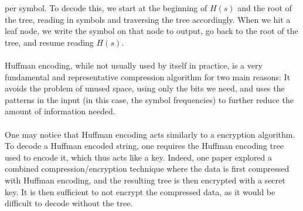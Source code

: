 \documentclass[11pt]{article}
\begin{document}
per symbol. To decode this, we start at the beginning of $H(s)$ and the root of the tree, reading in symbols 
and traversing the tree accordingly. When we hit a leaf node, we write the symbol on that node to output, 
go back to the root of the tree, and resume reading $H(s)$.\\\\
Huffman encoding, while not usually used by itself in practice, is a very fundamental and representative compression 
algorithm for two main reasons: It avoids the problem of unused space, using only the bits we need, and 
uses the patterns in the input (in this case, the symbol frequencies) to further reduce the amount of information needed.\\\\
One may notice that Huffman encoding acts similarly to a encryption algorithm. To decode a Huffman encoded string, 
one requires the Huffman encoding tree used to encode it, which thus acts like a key. Indeed, one paper\cite{sangwan} explored 
a combined compression/encryption technique where the data is first compressed with Huffman encoding, and the 
resulting tree is then encrypted with a secret key. It is then sufficient to not encrypt the compressed data, 
as it would be difficult to decode without the tree.
\end{document}
